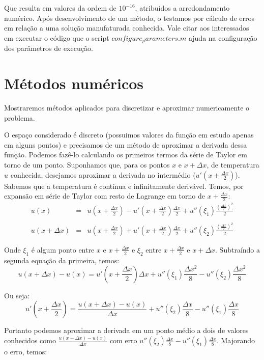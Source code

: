 \documentclass[12pt,fleqn]{article}
\begin{document}


Que resulta em valores da ordem de $10^{-16}$, atribuídos a arredondamento numérico. Após desenvolvimento de um método, o testamos por cálculo de erros em relação a uma solução manufaturada conhecida. Vale citar aos interessados em executar o código que o script $configure_parameters.m$ ajuda na configuração dos parâmetros de execução.

\section{Métodos numéricos}
Mostraremos métodos aplicados para discretizar e aproximar numericamente o problema.

O espaço considerado é discreto (possuimos valores da função em estudo apenas em alguns pontos) e precisamos de um método de aproximar a derivada dessa função. Podemos fazê-lo calculando os primeiros termos da série de Taylor em torno de um ponto. Suponhamos que, para os pontos $x$ e $x + \Delta x$, de temperatura $u$ conhecida, desejamos aproximar a derivada no intermédio ($u'(x + \frac{\Delta x}{2})$). Sabemos que a temperatura é contínua e infinitamente derivável. Temos, por expansão em série de Taylor com resto de Lagrange em torno de $x + \frac{\Delta x}{2}$:
\begin{equation}
\label{expansao_taylor_derivada}
\begin{array}{rcl}
	u(x) & = & u(x + \frac{\Delta x}{2}) - u'(x + \frac{\Delta x}{2}) \frac{\Delta x}{2} + u''(\xi_1) \frac{(\frac{\Delta x}{2}) ^ 2}{2} \\ \\
	u(x + \Delta x) & = & u(x + \frac{\Delta x}{2}) + u'(x + \frac{\Delta x}{2}) \frac{\Delta x}{2} + u''(\xi_2) \frac{(\frac{\Delta x}{2}) ^ 2}{2}
\end{array}
\end{equation}

Onde $\xi_1$ é algum ponto entre $x$ e $x + \frac{\Delta x}{2}$ e $\xi_2$ entre $x + \frac{\Delta x}{2}$ e $x + \Delta x$. Subtraíndo a segunda equação da primeira, temos:
\[u(x + \Delta x) - u(x) = u'(x + \frac{\Delta x}{2}) \Delta x + u''(\xi_1) \frac{\Delta x ^ 2}{8} - u''(\xi_2) \frac{\Delta x ^ 2}{8}\]

Ou seja:
\[u'(x + \frac{\Delta x}{2}) = \frac{u(x + \Delta x) - u(x)}{\Delta x} + u''(\xi_2) \frac{\Delta x}{8} - u''(\xi_1) \frac{\Delta x}{8}\]

Portanto podemos aproximar a derivada em um ponto médio a dois de valores conhecidos como $\frac{u(x + \Delta x) - u(x)}{\Delta x}$ com erro $u''(\xi_2) \frac{\Delta x}{8} - u''(\xi_1) \frac{\Delta x}{8}$. Majorando o erro, temos:
\end{document}
